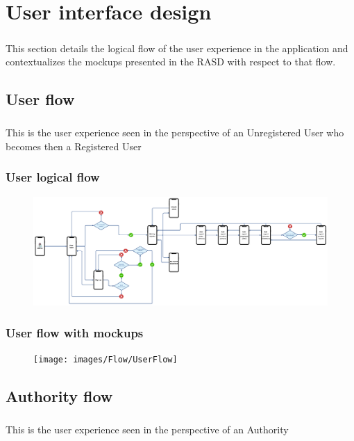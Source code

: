 	\chapter{User interface design}
		\paragraph{}
			This section details the logical flow of the user experience in the application and contextualizes the mockups presented in the RASD with respect to that flow.
		\section{User flow}
			\paragraph{}
				This is the user experience seen in the perspective of an Unregistered User who becomes then a Registered User
			\subsection{User logical flow}
			\begin{figure}[!h]
				\centering
				\includegraphics[width=\textwidth]{images/Flow/UserSimpleFlow}
			\end{figure}
			\clearpage
			\subsection{User flow with mockups}
			\begin{figure}[!h]
				\centering
				\texttt{[image: images/Flow/UserFlow]}
			\end{figure}
		\clearpage
		\section{Authority flow}
			\paragraph{}
				This is the user experience seen in the perspective of an Authority
